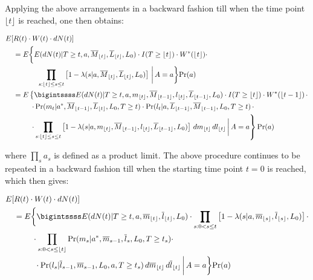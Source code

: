 \documentclass[AMA,STIX1COL]{WileyNJD-v2}
\newcommand{\pr}{\text{Pr}}
\begin{document}
Applying the above arrangements in a backward fashion till when the time point $\lfloor t \rfloor$ is reached, one then obtains:

\begingroup
\fontsize{10pt}{10pt}\selectfont
\begin{align*}
E[&R(t)\cdot W(t)\cdot dN(t)] \\
&=E \bigg\{E(dN(t) | T\ge t, a,\overline{M}_{\lfloor t \rfloor},\overline{L}_{\lfloor t \rfloor}, L_{0})\cdot I(T\ge \lfloor t\rfloor)\cdot W^*(\lfloor t \rfloor)\cdot \\
& ~~~~~~~~~~\bm\prod_{s: \lfloor t \rfloor \le s \le t} \left[ 1 - \lambda(s|a,\overline{M}_{\lfloor t \rfloor},\overline{L}_{\lfloor t \rfloor},L_0)\right] \,\bigg\rvert\,A=a  \bigg\}\pr(a)\\
&=E\left\{\bigintssss E (dN(t) | T\ge t, a,m_{\lfloor t \rfloor},\overline{M}_{\lfloor t-1 \rfloor},l_{\lfloor t \rfloor},\overline{L}_{\lfloor t-1 \rfloor}, L_{0})\cdot I(T\ge \lfloor t\rfloor)\cdot W^*(\lfloor t-1 \rfloor)\,\cdot \right.\\
&\,\,\,\,\,\,\,\,\,\,\,\,\,\,\left.\cdot \,\pr(m_t|a^*,\overline{M}_{\lfloor t-1 \rfloor},\overline{L}_{\lfloor t \rfloor},L_0,T\ge t)\cdot \pr(l_t|a,\overline{L}_{\lfloor t-1 \rfloor},\overline{M}_{\lfloor t-1 \rfloor},L_0,T\ge t)\,\cdot \right.\\
&\,\,\,\,\,\,\,\,\,\,\,\,\,\,\left.\cdot \bm\prod_{s: \lfloor t \rfloor \le s \le t} \left[ 1 - \lambda(s|a,m_{\lfloor t \rfloor},\overline{M}_{\lfloor t-1 \rfloor},l_{\lfloor t \rfloor},\overline{L}_{\lfloor t-1 \rfloor},L_0)\right] \,dm_{\lfloor t \rfloor}\,dl_{\lfloor t \rfloor}\vphantom{\frac{a}{b}}\,\bigg\rvert\,A=a \right\}\pr(a)
\end{align*}
\endgroup

where $\bm\prod_{s} a_s$ is defined as a product limit. The above procedure continues to be repeated in a backward fashion till when the starting time point $t = 0$ is reached, which then gives:

\begingroup
\fontsize{10pt}{10pt}\selectfont
\begin{align*}
E[&R(t)\cdot W(t)\cdot dN(t)] \\
&=E\bigg\{\bigintssss  E(dN(t) | T\ge t, a,\overline{m}_{\lfloor t \rfloor}, \overline{l}_{\lfloor t \rfloor}, L_{0}) \cdot \bm \prod_{s: 0<s \le t} \left[ 1 - \lambda(s|a,\overline{m}_{\lfloor s \rfloor},\overline{l}_{\lfloor s \rfloor},L_0)\right]\cdot \\
&\,\,\,\,\,\,\,\,\,\,\,\,\,\, \cdot \prod_{s: 0<s\le \lfloor t \rfloor} \pr(m_{s}| a^*, \overline{m}_{s - 1}, \overline{l}_{s}, L_{0}, T\ge t_s) \cdot\\
&~~~~~~~~ \cdot \pr(l_{s}|\overline{l}_{s-1}, \overline{m}_{s - 1}, L_0, a, T\ge t_s)\,d\overline{m}_{\lfloor t \rfloor}\,d\overline{l}_{\lfloor t \rfloor}\,\bigg\rvert\,A=a \bigg\}\pr(a)
\end{align*}
\endgroup
\end{document}
